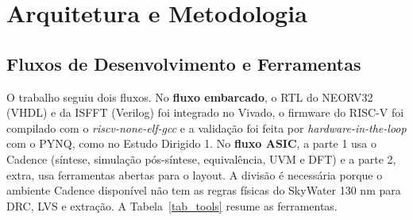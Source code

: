 \documentclass[conference]{IEEEtran}
\begin{document}
\section{Arquitetura e Metodologia}

\subsection{Fluxos de Desenvolvimento e Ferramentas}
O trabalho seguiu dois fluxos. No \textbf{fluxo embarcado}, o RTL do NEORV32 (VHDL) e da ISFFT (Verilog) foi integrado no Vivado, o firmware do RISC-V foi compilado com o \textit{riscv-none-elf-gcc} e a validação foi feita por \textit{hardware-in-the-loop} com o PYNQ, como no Estudo Dirigido 1. No \textbf{fluxo ASIC}, a parte 1 usa o Cadence (síntese, simulação pós-síntese, equivalência, UVM e DFT) e a parte 2, extra, usa ferramentas abertas para o layout. A divisão é necessária porque o ambiente Cadence disponível não tem as regras físicas do SkyWater 130 nm para DRC, LVS e extração. A Tabela~\ref{tab_tools} resume as ferramentas.

\begin{table}[htbp]
\caption{Ferramentas utilizadas em cada etapa}
\label{tab_tools}
\begin{center}
\end{center}
\end{table}
\end{document}
